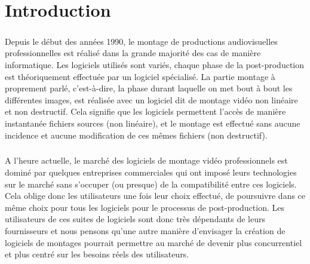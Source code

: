 








\setcounter{page}{1} \newpage \chapter*{Introduction}

\paragraph{}

Depuis le début des années 1990, le montage de
productions audiovisuelles professionnelles est réalisé dans la grande
majorité des cas de manière informatique. Les logiciels utilisés
sont variés, chaque phase de la post-production est théoriquement
effectuée par un logiciel spécialisé. La partie montage à proprement
parlé, c'est-à-dire, la phase durant laquelle on met bout à bout
les différentes images, est réalisée avec un logiciel dit de montage
vidéo non linéaire et non destructif. Cela signifie que les logiciels
permettent l'accès de manière instantanée %
fichiers sources (non linéaire), et le montage est effectué sans aucune
incidence et aucune modification de ces mêmes fichiers (non destructif).

\paragraph{}

A l'heure actuelle, le marché des logiciels de montage vidéo
professionnels est dominé par quelques entreprises commerciales qui ont
imposé leurs technologies sur le marché sans s'occuper (ou presque)
de la compatibilité entre ces logiciels.  Cela oblige donc
les utilisateurs une fois leur choix effectué, de poursuivre
dans ce même choix pour tous les logiciels
pour le processus de post-production. Les utilisateurs de ces suites
de logiciels sont donc très dépendants de leurs fournisseurs et nous
pensons qu'une autre manière d'envisager la création de logiciels de
montages pourrait permettre au marché de devenir plus concurrentiel et
plus centré sur les besoins réels des utilisateurs.


